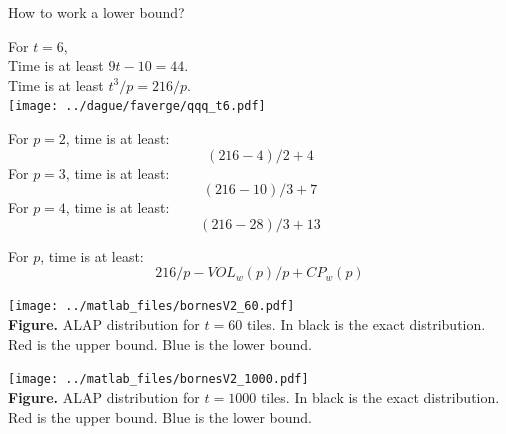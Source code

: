 \begin{frame}

How to work a lower bound?\\

\begin{minipage}{5cm}
For $t=6$,\\
Time is at least $9t-10 = 44$.\\
Time is at least $t^3/p = 216/p$.\\ 
\texttt{[image: ../dague/faverge/qqq\_t6.pdf]}\\
\end{minipage}
\begin{minipage}{5cm}
For $p=2$, time is at least:
$$ (216 - 4 ) / 2 + 4 $$
For $p=3$, time is at least:
$$ (216 - 10 ) / 3 + 7 $$
For $p=4$, time is at least:
$$ (216 - 28 ) / 3 + 13 $$

For $p$, time is at least:
$$ 216/p - VOL_w(p) / p + CP_w(p) $$
\end{minipage}



\end{frame}



\begin{frame}





\texttt{[image: ../matlab\_files/bornesV2\_60.pdf]}\\
{\bf Figure.} ALAP distribution for $t=60$ tiles. In black is the exact distribution. Red is the upper bound. Blue is the lower bound.




\end{frame}



\begin{frame}





\texttt{[image: ../matlab\_files/bornesV2\_1000.pdf]}\\
{\bf Figure.} ALAP distribution for $t=1000$ tiles. In black is the exact distribution. Red is the upper bound. Blue is the lower bound.




\end{frame}











